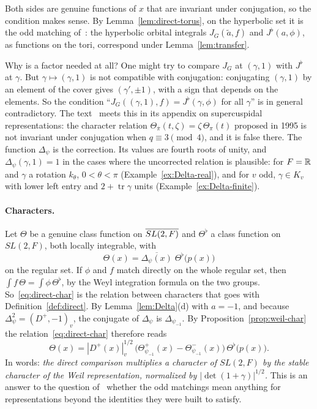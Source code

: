 Both sides are genuine functions of $x$ that are invariant under
conjugation, so the condition makes sense. By
Lemma~\ref{lem:direct-torus}, on the hyperbolic set it is the odd
matching of~\cite{JC26}: the hyperbolic orbital integrals $J_G(\tilde a,f)$
and $J^\flat(a,\phi)$, as functions on the tori, correspond under
Lemma~\ref{lem:transfer}.

Why is a factor needed at all? One might try to compare $J_G$ at
$(\gamma,1)$ with $J^\flat$ at $\gamma$. But $\gamma\mapsto(\gamma,1)$ is
not compatible with conjugation: conjugating $(\gamma,1)$ by an element
of the cover gives $(\gamma',\pm1)$, with a sign that depends on the
elements. So the condition ``$J_G((\gamma,1),f)=J^\flat(\gamma,\phi)$ for all
$\gamma$'' is in general contradictory. The text~\cite{JC26} meets this
in its appendix on supercuspidal representations: the character relation
$\Theta_{\overline\pi}(t,\zeta)=\zeta\,\Theta_\pi(t)$ proposed in 1995
is not invariant under conjugation when $q\equiv3\pmod4$, and it is false
there. The function $\Delta_\psi$ is the correction. Its values are
fourth roots of unity, and $\Delta_\psi(\gamma,1)=1$ in the cases where
the uncorrected relation is plausible: for $F=\mathbb{R}$ and $\gamma$ a
rotation $k_\theta$, $0<\theta<\pi$ (Example~\ref{ex:Delta-real}), and
for $v$ odd, $\gamma\in K_v$ with lower left entry and
$2+\operatorname{tr}\gamma$ units (Example~\ref{ex:Delta-finite}).

\paragraph{Characters.} Let $\Theta$ be a genuine class function on
$\overline{SL(2,F)}$ and $\Theta^\flat$ a class function on $SL(2,F)$, both locally
integrable, with
\begin{equation}\label{eq:direct-char}
\Theta(x)=\overline{\Delta_\psi(x)}\;\Theta^\flat\bigl(p(x)\bigr)
\end{equation}
on the regular set. If $\phi$ and $f$ match directly on the whole
regular set, then $\int f\,\Theta=\int\phi\,\Theta^\flat$, by the Weyl
integration formula on the two groups. So~\eqref{eq:direct-char} is the
relation between characters that goes with
Definition~\ref{def:direct}. By Lemma~\ref{lem:Delta}(d) with $a=-1$,
and because $\Delta_\psi^2=(D^+,-1)_v$, the conjugate of $\Delta_\psi$
is $\Delta_{\psi_{-1}}$. By Proposition~\ref{prop:weil-char} the
relation~\eqref{eq:direct-char} therefore reads
\begin{equation}\label{eq:direct-weil}
\Theta(x)=|D^+(x)|_v^{1/2}\,\bigl(\Theta^+_{\psi_{-1}}(x)-\Theta^-_{\psi_{-1}}
(x)\bigr)\,\Theta^\flat\bigl(p(x)\bigr).
\end{equation}
In words: \emph{the direct comparison multiplies a character of $SL(2,F)$
by the stable character of the Weil representation, normalized by
$|\det(1+\gamma)|^{1/2}$.} This is an answer to the question
of~\cite{JC26} whether the odd matchings mean anything for
representations beyond the identities they were built to satisfy.

